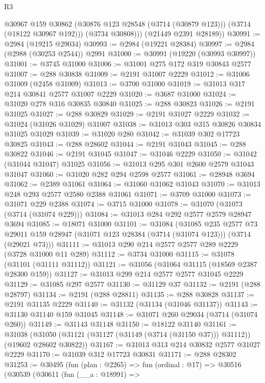 \begin{lexlean}{R3}
\begin{coremodule}
            @30967
            @159
            @30862
            (@30876 @123 @28548 (@3714 (@30879 @123)))
            (@3714 (@18122 @30967 @192)))
          (@3734 @30808)))
      (@21449 @2391 @28189))
@30991 := @2984 (@19215 @29034)
@30993 := @2984 (@19221 @28384)
@30997 := @2984 (@2988 (@30253 @2544)) @2991
@31000 := @30991 (@19220 (@30993 @30997))
@31001 := @3745 @31000
@31006 := @31001 @275 @172 @319 @30843 @2577
@31007 := @288 @30838
@31009 := @2191 @31007 @2229
@31012 := @31006 @31009 (@2458 @31009)
@31013 := @3700 @31000
@31019 := @31013 @317 @214 @30841 @2577 @31007 @2229
@31020 := @3687 @31000
@31024 := @31020 @278 @316 @30835 @30840
@31025 := @288 @30823
@31026 := @2191 @31025
@31027 := @288 @30829
@31029 := @2191 @31027 @2229
@31032 := @31024 (@31026 @31029) @31007
@31038 := @31013 @303 @315 @30826 @30834 @31025 @31029
@31039 := @31020 @280
@31042 := @31039 @302 @17723 @30825
@31043 := @288 @28602
@31044 := @2191 @31043
@31045 := @288 @30822
@31046 := @2191 @31045
@31047 := @31046 @2229
@31050 := @31042 (@31044 @31047) @31025
@31056 := @31013 @295 @301 @2600 @2579 @31043 @31047
@31060 := @31020 @282 @294 @2598 @2577
@31061 := @28948 @3694
@31062 := @2389 @31061
@31064 := @31060 @31062 @31043
@31070 := @31013 @248 @293 @2577 @2580 @2388 @31061
@31071 := @3709 @31000
@31073 := @31071 @229 @2388
@31074 := @3715 @31000
@31078 := @31070 (@31073 (@3714 (@31074 @229)))
@31084 := @31013 @284 @292 @2577 @2579 @28947 @3694
@31085 := @18071 @31000
@31101 := @31084
    (@31085
      @235
      @2577
      @73
      @29011
      @159
      @28947
      (@31071 @123 @28384 (@3714 (@31074 @123)))
      (@3714 (@29021 @73)))
@31111 := @31013 @290 @214 @2577 @2577 @289 @2229 (@3728 @31000 @11 @289)
@31112 := @3734 @31000
@31115 := @31078 (@31101 (@31111 @31112))
@31121 := @31056 (@31064 @31115 (@18569 @2387 @28300 @159))
@31127 := @31013 @299 @214 @2577 @2577 @31045 @2229
@31129 := @31085 @297 @2577
@31130 := @31129 @37
@31132 := @2191 (@288 @28797)
@31134 := @2191 (@288 @28811)
@31135 := @288 @30828
@31137 := @2191 @31135 @2229
@31140 := @31132 (@31134 (@31046 @31137))
@31143 := @31130 @31140 @159 @31045
@31148 := @31071 @260 @29034 (@3714 (@31074 @260))
@31149 := @31143 @31148
@31150 := @18122 @31140
@31161 := @31038
    (@31050 (@31121 (@31127 (@31149 (@3714 (@31150 @37))) @31112)) (@19602 @28602 @30822))
@31167 := @31013 @313 @214 @30832 @2577 @31027 @2229
@31170 := @31039 @312 @17723 @30831
@31171 := @288 @28302
@31253 := @30495
    (fun (plan : @2265) =>
    fun (ordinal : @17) =>
    @30516
      (@30539
        (@30611
          (fun (__a : @18991) =>

\end{coremodule}
\end{lexlean}
